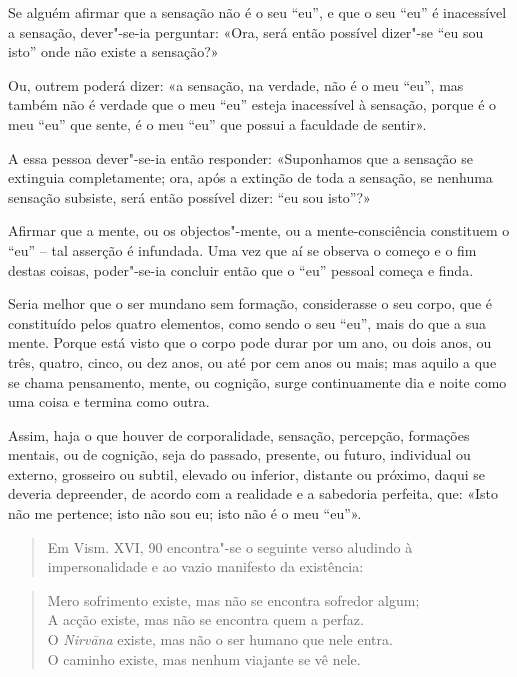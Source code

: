 Se alguém afirmar que a sensação não é o seu “eu”, e que o seu “eu” é
inacessível a sensação, dever"-se-ia perguntar: «Ora, será então possível
dizer"-se “eu sou isto” onde não existe a sensação?»

Ou, outrem poderá dizer: «a sensação, na verdade, não é o meu “eu”, mas também
não é verdade que o meu “eu” esteja inacessível à sensação, porque é o meu
“eu” que sente, é o meu “eu” que possui a faculdade de sentir».

A essa pessoa dever"-se-ia então responder: «Suponhamos que a sensação se
extinguia completamente; ora, após a extinção de toda a sensação, se nenhuma
sensação subsiste, será então possível dizer: “eu sou isto”?»


Afirmar que a mente, ou os objectos"-mente, ou a mente-consciência constituem o
“eu” -- tal asserção é infundada. Uma vez que aí se observa o começo e o fim
destas coisas, poder"-se-ia concluir então que o “eu” pessoal começa e finda.


Seria melhor que o ser mundano sem formação, considerasse o seu corpo, que é
constituído pelos quatro elementos, como sendo o seu “eu”, mais do que a sua
mente. Porque está visto que o corpo pode durar por um ano, ou dois anos, ou
três, quatro, cinco, ou dez anos, ou até por cem anos ou mais; mas aquilo a que
se chama pensamento, mente, ou cognição, surge continuamente dia e noite como
uma coisa e termina como outra.


Assim, haja o que houver de corporalidade, sensação, percepção, formações
mentais, ou de cognição, seja do passado, presente, ou futuro, individual ou
externo, grosseiro ou subtil, elevado ou inferior, distante ou próximo, daqui se
deveria depreender, de acordo com a realidade e a sabedoria perfeita, que: «Isto
não me pertence; isto não sou eu; isto não é o meu “eu”».


\begin{quote}
  Em Vism. XVI, 90 encontra"-se o seguinte verso aludindo à impersonalidade e ao
  vazio manifesto da existência:
\end{quote}

\begin{verse}
  Mero sofrimento existe, mas não se encontra sofredor algum;\\
  A acção existe, mas não se encontra quem a perfaz.\\
  O \emph{Nirvāna} existe, mas não o ser humano que nele entra.\\
  O caminho existe, mas nenhum viajante se vê nele.
\end{verse}

